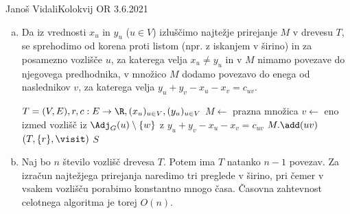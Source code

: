 \begin{naloga}{Janoš Vidali}{Kolokvij OR 3.6.2021}
\begin{odgovor}
\begin{enumerate}[(a)]
\item Da iz vrednosti $x_u$ in $y_u$ ($u \in V$)
izluščimo najtežje prirejanje $M$ v drevesu $T$,
se sprehodimo od korena proti listom (npr. z iskanjem v širino)
in za posamezno vozlišče $u$,
za katerega velja $x_u \ne y_u$
in v $M$ nimamo povezave do njegovega predhodnika,
v množico $M$ dodamo povezavo do enega od naslednikov $v$,
za katerega velja $y_u + y_v - x_u - x_v = c_{uv}$.
\begin{small}
\begin{algorithmic}
%
        {$T = (V, E), r, c : E \to \R, (x_u)_{u \in V}, (y_u)_{u \in V}$}
    \State $M \gets$ prazna množica
            \State $v \gets$ eno izmed vozlišč iz $\Adj_G(u) \setminus \{w\}$ z $y_u + y_v - x_u - x_v = c_{uv}$
            \State $M.\add(uv)$
        \EndIf
    \EndFunction
    $(T, \{r\}, \visit)$
    \State \Return $S$
\EndFunction
\end{algorithmic}
\end{small}

\item Naj bo $n$ število vozlišč drevesa $T$.
Potem ima $T$ natanko $n-1$ povezav.
Za izračun najtežjega prirejanja naredimo tri preglede v širino,
pri čemer v vsakem vozlišču porabimo konstantno mnogo časa.
Časovna zahtevnost celotnega algoritma je torej $O(n)$.


\end{enumerate}
\end{odgovor}
\end{naloga}
